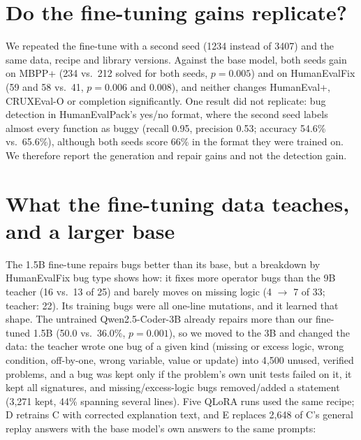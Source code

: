 \documentclass[11pt]{article}
\begin{document}
\section{Do the fine-tuning gains replicate?}
\label{sec:seed}

We repeated the fine-tune with a second seed (1234 instead of 3407) and the same data, recipe and
library versions. Against the base model, both seeds gain on MBPP+ (234 vs.\ 212 solved for both
seeds, $p=0.005$) and on HumanEvalFix (59 and 58 vs.\ 41, $p=0.006$ and $0.008$), and neither changes
HumanEval+, CRUXEval-O or completion significantly. One result did not replicate: bug
detection in HumanEvalPack's yes/no format, where the second seed labels almost every function as
buggy (recall 0.95, precision 0.53; accuracy 54.6\% vs.\ 65.6\%), although both seeds score 66\% in
the format they were trained on. We therefore report the generation and repair gains and not the
detection gain.

\section{What the fine-tuning data teaches, and a larger base}
\label{sec:v3}

The 1.5B fine-tune repairs bugs better than its base, but a breakdown by HumanEvalFix bug type shows
how: it fixes more operator bugs than the 9B teacher (16 vs.\ 13 of 25) and barely moves on missing
logic (4 $\rightarrow$ 7 of 33; teacher: 22). Its training bugs were all one-line mutations, and it
learned that shape. The untrained Qwen2.5-Coder-3B already repairs more than our fine-tuned 1.5B
(50.0 vs.\ 36.0\%, $p=0.001$), so we moved to the 3B and changed the data: the teacher wrote one bug
of a given kind (missing or excess logic, wrong condition, off-by-one, wrong variable, value or
update) into 4{,}500 unused, verified problems, and a bug was kept only if the problem's own unit
tests failed on it, it kept all signatures, and missing/excess-logic bugs removed/added a statement
(3{,}271 kept, 44\% spanning several lines). Five QLoRA runs used the same recipe; D retrains C with
corrected explanation text, and E replaces 2{,}648 of C's general replay answers with the base
model's own answers to the same prompts:
\end{document}
